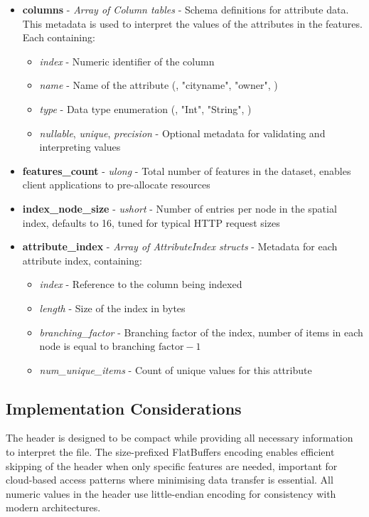 \begin{itemize}
  \item \textbf{columns} - \textit{Array of Column tables} - Schema definitions for attribute data. This metadata is used to interpret the values of the attributes in the features. Each containing:
    \begin{itemize}
      \item \textit{index} - Numeric identifier of the column
      \item \textit{name} - Name of the attribute (\eg, "cityname", "owner", \etc)
      \item \textit{type} - Data type enumeration (\eg, "Int", "String", \etc)
      \item \textit{nullable}, \textit{unique}, \textit{precision} - Optional metadata for validating and interpreting values
    \end{itemize}

  \item \textbf{features\_count} - \textit{ulong} - Total number of features in the dataset, enables client applications to pre-allocate resources

  \item \textbf{index\_node\_size} - \textit{ushort} - Number of entries per node in the spatial index, defaults to 16, tuned for typical HTTP request sizes

  \item \textbf{attribute\_index} - \textit{Array of AttributeIndex structs} - Metadata for each attribute index, containing:
    \begin{itemize}
      \item \textit{index} - Reference to the column being indexed
      \item \textit{length} - Size of the index in bytes
      \item \textit{branching\_factor} - Branching factor of the index, number of items in each node is equal to $\text{branching factor} - 1$
      \item \textit{num\_unique\_items} - Count of unique values for this attribute
    \end{itemize}
\end{itemize}

\subsection{Implementation Considerations}
\label{methodology:header:implementation}

The header is designed to be compact while providing all necessary information to interpret the file. The size-prefixed FlatBuffers encoding enables efficient skipping of the header when only specific features are needed, important for cloud-based access patterns where minimising data transfer is essential. All numeric values in the header use little-endian encoding for consistency with modern architectures.
